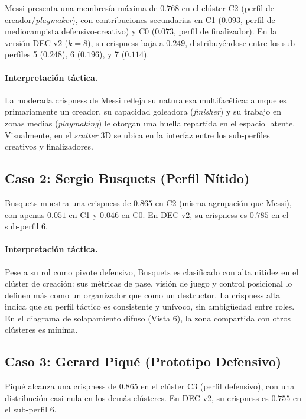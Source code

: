\documentclass[conference]{IEEEtran}
\begin{document}
Messi presenta una membresía máxima de $0.768$ en el clúster C2 (perfil de creador/\textit{playmaker}), con contribuciones secundarias en C1 ($0.093$, perfil de mediocampista defensivo-creativo) y C0 ($0.073$, perfil de finalizador). En la versión DEC v2 ($k=8$), su crispness baja a $0.249$, distribuyéndose entre los sub-perfiles 5 ($0.248$), 6 ($0.196$), y 7 ($0.114$).

\paragraph{Interpretación táctica.} La moderada crispness de Messi refleja su naturaleza multifacética: aunque es primariamente un creador, su capacidad goleadora (\textit{finisher}) y su trabajo en zonas medias (\textit{playmaking}) le otorgan una huella repartida en el espacio latente. Visualmente, en el \textit{scatter} 3D se ubica en la interfaz entre los sub-perfiles creativos y finalizadores.

\subsection{Caso 2: Sergio Busquets (Perfil Nítido)}

Busquets muestra una crispness de $0.865$ en C2 (misma agrupación que Messi), con apenas $0.051$ en C1 y $0.046$ en C0. En DEC v2, su crispness es $0.785$ en el sub-perfil 6.

\paragraph{Interpretación táctica.} Pese a su rol como pivote defensivo, Busquets es clasificado con alta nitidez en el clúster de creación: sus métricas de pase, visión de juego y control posicional lo definen más como un organizador que como un destructor. La crispness alta indica que su perfil táctico es consistente y unívoco, sin ambigüedad entre roles. En el diagrama de solapamiento difuso (Vista 6), la zona compartida con otros clústeres es mínima.

\subsection{Caso 3: Gerard Piqué (Prototipo Defensivo)}

Piqué alcanza una crispness de $0.865$ en el clúster C3 (perfil defensivo), con una distribución casi nula en los demás clústeres. En DEC v2, su crispness es $0.755$ en el sub-perfil 6.
\end{document}
